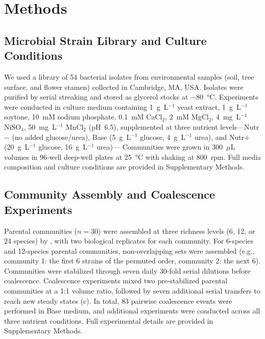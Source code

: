 \section{Methods}
\label{sec:methods}

\subsection*{Microbial Strain Library and Culture Conditions}
\label{sec:methods:strains}

We used a library of 54 bacterial isolates from environmental samples (soil, tree surface, and flower stamen) collected in Cambridge, MA, USA.  Isolates were purified by serial streaking and stored as glycerol stocks at $-80$~°C. Experiments were conducted in culture medium containing 1~g~L$^{-1}$ yeast extract, 1~g~L$^{-1}$ soytone, 10~mM sodium phosphate, 0.1~mM CaCl$_2$, 2~mM MgCl$_2$, 4~mg~L$^{-1}$ NiSO$_4$, 50~mg~L$^{-1}$ MnCl$_2$ (pH~6.5), supplemented at three nutrient levels---Nutr$-$ (no added glucose/urea), Base (5~g~L$^{-1}$ glucose, 4~g~L$^{-1}$ urea), and Nutr$+$ (20~g~L$^{-1}$ glucose, 16~g~L$^{-1}$ urea)--- Communities were grown in 300~$\mu$L volumes in 96-well deep-well plates at 25~°C with shaking at 800~rpm. Full media composition and culture conditions are provided in Supplementary Methods.


\subsection*{Community Assembly and Coalescence Experiments}
\label{sec:methods:coalescence}

Parental communities ($n = 30$) were assembled at three richness levels (6, 12, or 24 species) by , with two biological replicates for each community. For 6-species and 12-species parental communities, non-overlapping sets were assembled (e.g., community 1: the first 6 strains of the permuted order, community 2: the next 6).  Communities were stabilized through seven daily 30-fold serial dilutions before coalescence. Coalescence experiments mixed two pre-stabilized parental communities at a 1:1 volume ratio, followed by seven additional serial transfers to reach new steady states (c). In total, 83 pairwise coalescence events were performed in Base medium, and additional experiments were conducted across all three nutrient conditions. Full experimental details are provided in Supplementary Methods.


